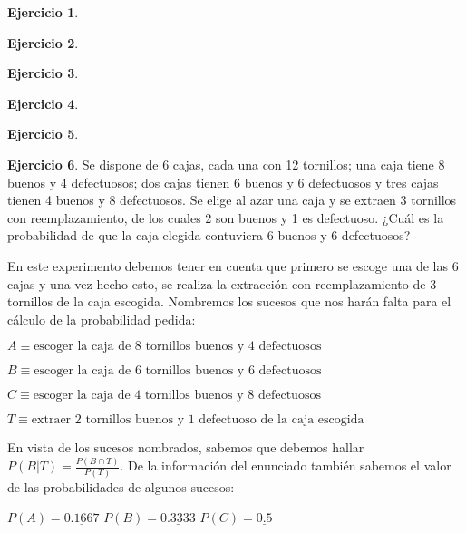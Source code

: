 \documentclass[a4paper, 12pt]{article}
\theoremstyle{definition}
\newtheorem{ej}{Ejercicio}
\begin{document}
\begin{ej}
\end{ej}

\begin{ej}
\end{ej}

\begin{ej}
\end{ej}

\begin{ej}
\end{ej}

\begin{ej}
\end{ej}

\newpage

\begin{ej}
Se dispone de 6 cajas, cada una con 12 tornillos; una caja tiene 8 buenos y 4 defectuosos; dos
cajas tienen 6 buenos y 6 defectuosos y tres cajas tienen 4 buenos y 8 defectuosos. Se elige al
azar una caja y se extraen 3 tornillos con reemplazamiento, de los cuales 2 son buenos y 1 es
defectuoso. ¿Cuál es la probabilidad de que la caja elegida contuviera 6 buenos y 6 defectuosos?

\medskip

En este experimento debemos tener en cuenta que primero se escoge una de las 6 cajas y una vez hecho esto, se realiza la extracción con reemplazamiento de 3 tornillos de la caja escogida. Nombremos los sucesos que nos harán falta para el cálculo de la probabilidad pedida:

\begin{center}
    $A \equiv \text{escoger la caja de 8 tornillos buenos y 4 defectuosos}$
    
    $B \equiv \text{escoger la caja de 6 tornillos buenos y 6 defectuosos}$
    
    $C \equiv \text{escoger la caja de 4 tornillos buenos y 8 defectuosos}$
    
    $T \equiv \text{extraer 2 tornillos buenos y 1 defectuoso de la caja escogida}$
\end{center}

En vista de los sucesos nombrados, sabemos que debemos hallar $P(B|T) = \frac{P(B \cap T)}{P(T)}$. De la información del enunciado también sabemos el valor de las probabilidades de algunos sucesos:

\begin{center}
    $P(A) = \underline{0.1667}$ \hspace{1cm} $P(B) = \underline{0.3333}$ \hspace{1cm} $P(C) = \underline{0.5}$
\end{center}


\end{ej}
\end{document}
